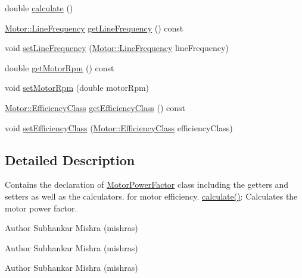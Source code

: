 \begin{DoxyCompactItemize}
\item 
double \hyperlink{class_motor_power_factor_ac9d5742db4a371bc4e15d5b29d335b6e}{calculate} ()
\item 
\hyperlink{class_motor_acee1bdf1b684ad36cb80dc2829d9fcee}{Motor\+::\+Line\+Frequency} \hyperlink{class_motor_power_factor_aa4cdc420b1f611bcb9f4a69c69c1fabf}{get\+Line\+Frequency} () const
\item 
void \hyperlink{class_motor_power_factor_a5186ccae4191cfc5b2b7c3bdbd166563}{set\+Line\+Frequency} (\hyperlink{class_motor_acee1bdf1b684ad36cb80dc2829d9fcee}{Motor\+::\+Line\+Frequency} line\+Frequency)
\item 
double \hyperlink{class_motor_power_factor_acc7e144fc6c05446141cb0e07be03d70}{get\+Motor\+Rpm} () const
\item 
void \hyperlink{class_motor_power_factor_a4154bf52c6c9c9e5fb2f0985d7ae3531}{set\+Motor\+Rpm} (double motor\+Rpm)
\item 
\hyperlink{class_motor_afa022971ae062406a9f588c601673d4e}{Motor\+::\+Efficiency\+Class} \hyperlink{class_motor_power_factor_a1ce98cb6ae9fbf09b05b4b6bd75e5c71}{get\+Efficiency\+Class} () const
\item 
void \hyperlink{class_motor_power_factor_add3125243d7f11131abc4e1d172ffdfc}{set\+Efficiency\+Class} (\hyperlink{class_motor_afa022971ae062406a9f588c601673d4e}{Motor\+::\+Efficiency\+Class} efficiency\+Class)
\end{DoxyCompactItemize}


\subsection{Detailed Description}
Contains the declaration of \hyperlink{class_motor_power_factor}{Motor\+Power\+Factor} class including the getters and setters as well as the calculators. for motor efficiency. \hyperlink{class_motor_power_factor_ac9d5742db4a371bc4e15d5b29d335b6e}{calculate()}\+: Calculates the motor power factor. 

\begin{DoxyAuthor}{Author}
Subhankar Mishra (mishras) 
\end{DoxyAuthor}


\begin{DoxyAuthor}{Author}
Subhankar Mishra (mishras) 
\end{DoxyAuthor}


\begin{DoxyAuthor}{Author}
Subhankar Mishra (mishras) 
\end{DoxyAuthor}


